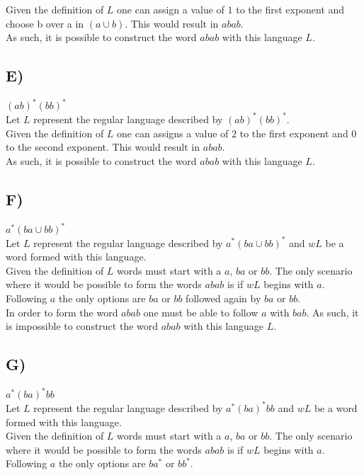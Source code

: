 \documentclass{report}
\begin{document}
Given the definition of $L$ one can assign a value of $1$ to the first exponent and choose b over a in $(a\cup b)$. This would result in $abab$.\\

As such, it is possible to construct the word $abab$ with this language $L$.
\subsection*{E)}
$(ab)^*(bb)^*$\\
Let $L$ represent the regular language described by $(ab)^*(bb)^*$.\\

Given the definition of $L$ one can assigns a value of $2$ to the first exponent and $0$ to the second exponent. This would result in $abab$.\\

As such, it is possible to construct the word $abab$ with this language $L$.
\subsection*{F)}
$a^*(ba \cup bb)^*$\\
Let $L$ represent the regular language described by $a^*(ba \cup bb)^*$ and $wL$ be a word formed with this language.\\

Given the definition of $L$ words must start with a $a$, $ba$ or $bb$. The only scenario where it would be possible to form the words $abab$ is if $wL$ begins with $a$. Following $a$ the only options are $ba$ or $bb$ followed again by $ba$ or $bb$.\\

In order to form the word $abab$ one must be able to follow $a$ with $bab$. As such, it is impossible to construct the word $abab$ with this language $L$.
\subsection*{G)}
$a^*(ba)^*bb$\\
Let $L$ represent the regular language described by $a^*(ba)^*bb$ and $wL$ be a word formed with this language.\\

Given the definition of $L$ words must start with a $a$, $ba$ or $bb$. The only scenario where it would be possible to form the words $abab$ is if $wL$ begins with $a$. Following $a$ the only options are $ba^*$ or $bb^*$.\\
\end{document}

